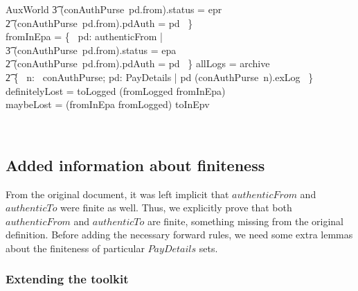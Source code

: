 \begin{LSDef}
\begin{schema}{AuxWorld}
          \t3 (conAuthPurse~pd.from).status = epr \\
          \t2 \land (conAuthPurse~pd.from).pdAuth = pd ~\} \\
   fromInEpa = \{~ pd: authenticFrom | \\
          \t3 (conAuthPurse~pd.from).status = epa \\
          \t2 \land (conAuthPurse~pd.from).pdAuth = pd ~\}
   \also
   allLogs = archive \cup \\
      \t2 \{~ n: \dom~conAuthPurse; pd: PayDetails | pd \in (conAuthPurse~n).exLog ~\}
   \also
   definitelyLost = toLogged \cap (fromLogged \cup fromInEpa) \\
   maybeLost = (fromInEpa \cup fromLogged) \cap toInEpv
\end{schema}~\end{LSDef}
%

\subsection{Added information about finiteness}


From the original document, it was left implicit that $authenticFrom$ and $authenticTo$ were finite as well.
Thus, we explicitly prove that both $authenticFrom$ and $authenticTo$ are finite, something missing from
the original definition. Before adding the necessary forward rules, we need some extra lemmas about the
finiteness of particular $PayDetails$ sets.

\subsubsection{Extending the toolkit}


